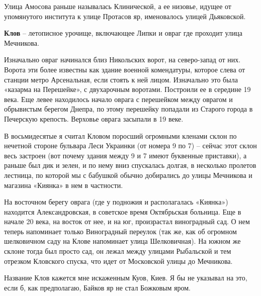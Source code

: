 Улица Амосова раньше называлась Клинической, а ее низовье, идущее от упомянутого института к улице Протасов яр, именовалось улицей Дьяковской.\\

\medskip

\textbf{Клов} – летописное урочище, включающее Липки и овраг где проходит улица Мечникова. 

Изначально овраг начинался близ Никольских ворот, на северо-запад от них. Ворота эти более известны как здание военной комендатуры, которое слева от станции метро Арсенальная, если стоять к ней лицом. Изначально это была «казарма на Перешейке», с двухарочным воротами. Построили ее в середине 19 века. Еще левее находилось начало оврага с перешейком между оврагом и обрывистым берегом Днепра, по этому перешейку попадали из Старого города в Печерскую крепость. Верховье оврага засыпали в 19 веке.


В восьмидесятые я считал Кловом поросший огромными кленами склон по нечетной стороне бульвара Леси Украинки (от номера 9 по 7) – сейчас этот склон весь застроен (вот почему здания между 9 и 7 имеют буквенные приставки), а раньше был дик и зелен, и по нему вниз спускалась долгая, в несколько пролетов лестница, по которой мы с бабушкой обычно добирались до улицы Мечникова и магазина «Киянка» в нем в частности.

На восточном берегу оврага (где у подножия и располагалась «Киянка») находится Александровская, в советское время Октябрьская больница. Еще в начале 20 века, на восток от нее, и на юг, произрастал виноградный сад. О нем теперь напоминает только Виноградный переулок (так же, как об огромном шелковичном саду на Клове напоминает улица Шелковичная). На южном же склоне тогда был просто сад, он лежал между улицами Рыбальской и тем отрезком Кловского спуска, что идет от Московской улицы до Мечникова.

Название Клов кажется мне искаженным Куов, Киев. Я бы не указывал на это, если б, как предполагаю, Байков яр не стал Божковым яром.


